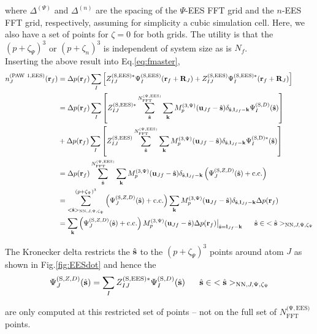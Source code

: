 \documentclass[paper=a4, fontsize=11pt]{article} %
\numberwithin{equation}{section} %
\numberwithin{figure}{section} %
\numberwithin{table}{section} %
\newcommand{\bu}{{\bf{u}}}
\newcommand{\bl}{{\bf{l}}}
\newcommand{\bk}{{\bf{k}}}
\newcommand{\bs}{{\bf{s}}}
\newcommand{\br}{{\bf{r}}}
\newcommand{\bR}{{\bf{R}}}
\newcommand{\hs}{{\hat{\bf{s}}}}
\newcommand{\rS}{{\mathrm{S}}}
\newcommand{\rEES}{{\mathrm{EES}}}
\newcommand{\rNN}{{\mathrm{NN}}}
\newcommand{\rcc}{{\mathrm{c.c.}}}
\newcommand{\rP}{{\mathrm{PAW}}}
\newcommand{\rD}{{\mathrm{D}}}
\newcommand{\NFFTpEES}{{N^{\mathrm{(\Psi,\rEES})}_{\mathrm{FFT}}}}
\newcommand{\Mp}{{M_p^{(3,\Psi)}}}
\newcommand{\pzp}{{(p+\zeta_{\Psi})^3}}
\newcommand{\pzn}{{(p+\zeta_n)^3}}
\newcommand{\hsJp}{{<\hs>_{\rNN,J,\Psi,\zeta_\Psi}}}
\newcommand{\hsinJp}{{\ \ \ \ \ \hs  \in  \hsJp}}
\begin{document}
where $\Delta^{(\Psi)}$ and $\Delta^{(n)}$ are the spacing of the $\Psi$-EES FFT grid and the $n$-EES FFT grid, respectively, assuming for simplicity a cubic simulation cell. Here, we also have a set of points for $\zeta = 0$ for both grids. The utility is that the $\pzp$ or $\pzn$ is independent of system size as is $N_f$.\\

Inserting the above result into Eq.\eqref{eq:fmaster},
\begin{equation}\label{eq:n1rfEES}
\begin{split}
n_J^{(\rP\ 1,\rEES)}(\br_f)
&= \Delta p(\br_f)\sum_I \left[Z_{IJ}^{(\rS,\rEES)*}\Psi_I^{(\rS,\rEES)}(\br_f+\bR_J)  + Z_{IJ}^{(\rS,\rEES)}\Psi_I^{(\rS,\rEES)*}(\br_f+\bR_J) \right] \\
&= \Delta p(\br_f)\sum_I \left[Z_{IJ}^{(\rS,\rEES)*} \sum_{\hat \bs}^{\NFFTpEES} \sum_{\bk} \Mp(\bu_{Jf}-\hat \bs)\delta_{\hat \bs,\bl_{Jf}-\bk} \Psi_I^{(\rS,D)}(\hs)\right] \\
&+ \Delta p(\br_f)\sum_I \left[Z_{IJ}^{(\rS,\rEES)} \sum_{\hat \bs}^{\NFFTpEES} \sum_{\bk} \Mp(\bu_{Jf}-\hat \bs)\delta_{\hat \bs,\bl_{Jf}-\bk} \Psi_I^{(\rS,\rD)*}(\hat \bs)\right] \\
& = \Delta p(\br_f)\sum_{\hat \bs}^{\NFFTpEES} \sum_{\bk} \Mp(\bu_{Jf}-\hat \bs)\delta_{\hat \bs,\bl_{Jf}-\bk} \left(\Psi_J^{(\rS,Z,D)}(\hs)+ \rcc\right) \\
& =\sum_{\hsJp}^{\pzp} \left(\Psi_J^{(\rS,Z,D)}(\hs)+ \rcc\right)\sum_{\bk} \Mp(\bu_{Jf}-\hat \bs) \delta_{\hat \bs,\bl_{Jf}-\bk}\Delta p(\br_f)\\
&=\sum_{\bk} \left(\Psi_J^{(\rS,Z,D)}(\hs)+ \rcc\right) \Mp(\bu_{Jf}-\hat \bs) \Delta p(\br_f)\big|_{\hs=\bl_{Jf}-\bk}\hsinJp \\
\end{split}
\end{equation}

The Kronecker delta restricts the $\hs$ to the $\pzp$ points around atom $J$ as shown in Fig.\ref{fig:EESdot} and hence the
\begin{equation}
\Psi_J^{(\rS,Z,D)}(\hat \bs)=\sum_I Z_{IJ}^{(\rS,\rEES)*} \Psi_I^{(\rS,D)}(\hs) \hsinJp\\
\end{equation}

are only computed at this restricted set of points -- not on the full set of $\NFFTpEES$ points. \\
\end{document}
